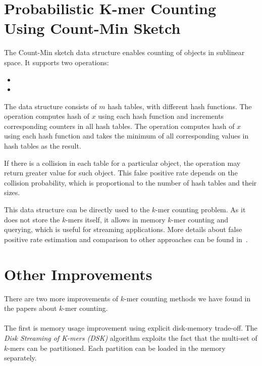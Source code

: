 \section{Probabilistic K-mer Counting Using Count-Min Sketch}

The Count-Min sketch\cite{countminsketch} data structure enables counting of objects in sublinear space. It supports two operations:
\begin{itemize}
  \item {} %
  \item {} %
\end{itemize}

The data structure consists of $m$ hash tables, with different hash functions.
The  operation computes hash of $x$ using each hash function and increments corresponding counters in all hash tables. The  operation computes hash of $x$ using each hash function and takes the minimum of all corresponding values in hash tables as the result. %

If there is a collision in each table for a particular object, the  operation may return greater value for such object. This false positive rate depends on the collision probability, which is proportional to the number of hash tables and their sizes.

This data structure can be directly used to the $k$-mer counting problem. As it does not store the $k$-mers itself, it allows in memory $k$-mer counting and querying, which is useful for streaming applications.
More details about false positive rate estimation and comparison to other approaches can be found in~\cite{khmer}.

\section{Other Improvements}

There are two more improvements of $k$-mer counting methods we have found in the papers about $k$-mer counting.

\paragraph{} The first is memory usage improvement using explicit disk-memory trade-off. The \emph{Disk Streaming of K-mers (DSK)} algorithm\cite{dsk} exploits the fact that the multi-set of $k$-mers can be partitioned. Each partition can be loaded in the memory separately.

